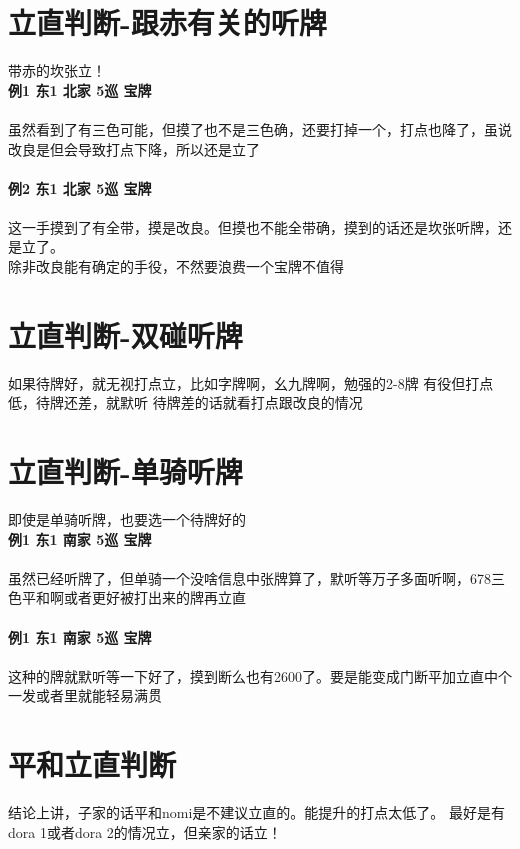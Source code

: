 \documentclass[小V的日麻笔记.tex]{subfiles}
\begin{document}
\section{立直判断-跟赤有关的听牌}
带赤的坎张立！
\\
\textbf{例1 东1 北家 5巡 宝牌}
\\
\\
虽然看到了有三色可能，但摸了也不是三色确，还要打掉一个，打点也降了，虽说改良是但会导致打点下降，所以还是立了
\\
\hrulefill 
\\
\textbf{例2 东1 北家 5巡 宝牌}
\\
\\
这一手摸到了有全带，摸是改良。但摸也不能全带确，摸到的话还是坎张听牌，还是立了。
\\

除非改良能有确定的手役，不然要浪费一个宝牌不值得

\section{立直判断-双碰听牌}
\begin{itemize}
\arrowitem 如果待牌好，就无视打点立，比如字牌啊，幺九牌啊，勉强的2-8牌
\arrowitem 有役但打点低，待牌还差，就默听 
\arrowitem 待牌差的话就看打点跟改良的情况
\end{itemize}

\section{立直判断-单骑听牌}
即使是单骑听牌，也要选一个待牌好的
\\
\textbf{例1 东1 南家 5巡 宝牌}
\\
\\
虽然已经听牌了，但单骑一个没啥信息中张牌算了，默听等万子多面听啊，678三色平和啊或者更好被打出来的牌再立直
\\
\hrulefill 
\\
\textbf{例1 东1 南家 5巡 宝牌}
\\
\\
这种的牌就默听等一下好了，摸到断么也有2600了。要是能变成门断平加立直中个一发或者里就能轻易满贯

\section{平和立直判断}
结论上讲，子家的话平和nomi是不建议立直的。能提升的打点太低了。 最好是有dora 1或者dora 2的情况立，但亲家的话立！ 
\end{document}
